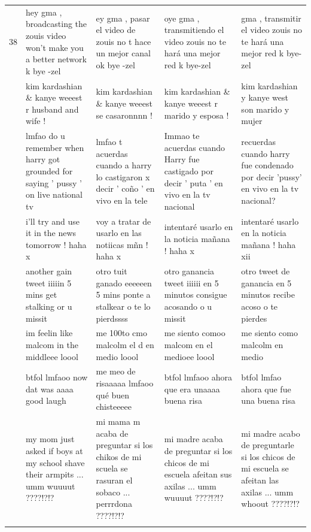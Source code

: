 \documentclass[11pt]{article}
\begin{document}
{\begin{longtable}{c p{3.3cm} p{3.3cm} p{3.3cm} p{3.3cm}}
  38 & hey gma , broadcasting the zouis video won't make you a better network k bye -zel & ey gma , pasar el video de zouis no t hace un mejor canal ok bye -zel & oye gma , transmitiendo el video zouis no te hará una mejor red k bye-zel & gma , transmitir el video zouis no te hará una mejor red k bye-zel \\
  \addlinespace
  39 & kim kardashian \& kanye weeest r husband and wife ! & kim kardashian \& kanye weeest se casaronnnn ! & kim kardashian \& kanye weeest r marido y esposa ! & kim kardashian y kanye west son marido y mujer \\
  \addlinespace
  40 & lmfao do u remember when harry got grounded for saying ' pussy ' on live national tv & lmfao t acuerdas cuando a harry lo castigaron x decir ' coño ' en vivo en la tele & Immao te acuerdas cuando Harry fue castigado por decir ' puta ' en vivo en la tv nacional & recuerdas cuando harry fue condenado por decir 'pussy' en vivo en la tv nacional? \\
  \addlinespace
  41 & i'll try and use it in the news tomorrow ! haha x & voy a tratar de usarlo en las notiicas mñn ! haha x & intentaré usarlo en la noticia mañana ! haha x & intentaré usarlo en la noticia mañana ! haha xii \\
  \addlinespace
  42 & another gain tweet iiiiin 5 mins get stalking or u missit & otro tuit ganado eeeeeen 5 mins ponte a stalkear o te lo pierdssss & otro ganancia tweet iiiiii en 5 minutos consigue acosando o u missit & otro tweet de ganancia en 5 minutos recibe acoso o te pierdes \\
  \addlinespace
  43 & im feelin like malcom in the middleee loool & me 100to cmo malcolm el d en medio loool & me siento comoo malcom en el medioee loool & me siento como malcolm en medio \\
  \addlinespace
  44 & btfol lmfaoo now dat was aaaa good laugh & me meo de risaaaaa lmfaoo qué buen chisteeeee & btfol lmfaoo ahora que era unaaaa buena risa & btfol lmfao ahora que fue una buena risa \\
  \addlinespace
  45 & my mom just asked if boys at my school shave their armpits ... umm wuuuut ????!?!? & mi mama m acaba de preguntar si los chikos de mi scuela se rasuran el sobaco ... perrrdona ????!?!? & mi madre acaba de preguntar si los chicos de mi escuela afeitan sus axilas ... umm wuuuut ????!?!? & mi madre acabo de preguntarle si los chicos de mi escuela se afeitan las axilas ... umm whoout ????!?!? \\
  \addlinespace

\end{longtable}
}
\end{document}
